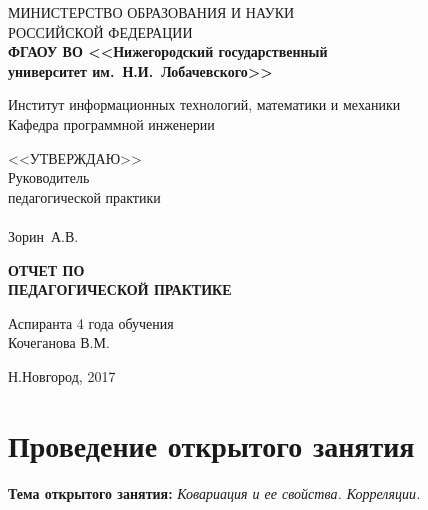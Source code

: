 \documentclass[14pt]{extarticle}
\theoremstyle{theorem}
\theoremstyle{remark}
\begin{document}
\begin{titlepage}

  \begin{center}
  {
    {МИНИСТЕРСТВО ОБРАЗОВАНИЯ И НАУКИ \\РОССИЙСКОЙ ФЕДЕРАЦИИ} }\\
    {
    \textbf{%
    {ФГАОУ ВО 
      <<Нижегородский государственный\\ университет им.~Н.И.~Лобачевского>>}
    }
    }

 \medskip

 
   { Институт информационных технологий, математики и механики }\\
    Кафедра программной инженерии

    
 \medskip
  \medskip
   \medskip \medskip
    \medskip
     \medskip
      \medskip
     \hfill
    \begin{minipage}[h]{ 0.33\linewidth}
    <<УТВЕРЖДАЮ>>\\
    Руководитель \\
    педагогической практики\\
\\
    \underline{\hspace{3cm}} Зорин~А.В.
    \end{minipage}
   \medskip \medskip
    \medskip
     \medskip
      \medskip
   \medskip \medskip
    \medskip
     \medskip
      \medskip
      
    \textbf{ОТЧЕТ  ПО}\\ \textbf{ПЕДАГОГИЧЕСКОЙ ПРАКТИКЕ}\\
 \medskip

    
         \medskip
      \medskip
               \medskip
      \medskip
    \hfill
    \begin{minipage}[h]{ 0.5\linewidth}
    Аспиранта 4 года обучения\\
    Кочеганова В.М.
    \end{minipage}
    \vfill {Н.Новгород, 2017}
  \end{center}
\end{titlepage}

\tableofcontents
\newpage

\section{Проведение открытого занятия}

  \medskip
\textbf{Тема открытого занятия:} \textit{Ковариация и ее свойства. Корреляции.}
\end{document}

